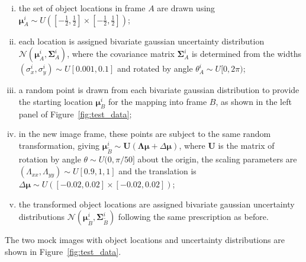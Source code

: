 \documentclass[manuscript]{aastex}
\newcommand{\bsmu}{\boldsymbol\mu}
\newcommand{\bsS}{\boldsymbol\Sigma}
\newcommand{\bsL}{\boldsymbol\Lambda}
\begin{document}
\begin{enumerate}[(i)]
\item the set of object locations in frame $A$ are drawn using $\bsmu^i_A\sim U\left([-\frac{1}{2},\frac{1}{2}]\times[-\frac{1}{2},\frac{1}{2}]\right)$;
\item each location is assigned bivariate gaussian uncertainty distribution $\mathcal{N}\left(\bsmu^i_A,\bsS^i_A\right)$, where the covariance matrix $\bsS^i_A$ is determined from the widths $\left(\sigma_x^i,\sigma_y^i\right)\sim U[0.001,0.1]$ and rotated by angle $\theta^i_A\sim U[0,2\pi)$;
\item a random point is drawn from each bivariate gaussian distribution to provide the starting location $\bsmu^i_B$ for the mapping into frame $B$, as shown in the left panel of Figure~\ref{fig:test_data};
\item in the new image frame, these points are subject to the same random transformation, giving $\bsmu^i_{\tilde{B}}\sim\mathbf{U}(\bsL\bsmu + \Delta\bsmu)$, where $\mathbf{U}$ is the matrix of rotation by angle $\theta\sim U(0,\pi/50]$ about the origin, the scaling parameters are $\left(\Lambda_{xx}, \Lambda_{yy}\right)\sim U[0.9,1,1]$ and the translation is $\Delta\bsmu\sim U\left([-0.02,0.02]\times[-0.02,0.02]\right)$;
\item the transformed object locations are assigned bivariate gaussian uncertainty distributions $\mathcal{N}\left(\bsmu^i_{\tilde{B}},\bsS^i_{\tilde{B}}\right)$ following the same prescription as before.
\end{enumerate}
The two mock images with object locations and uncertainty distributions are shown in Figure~\ref{fig:test_data}.
\end{document}
